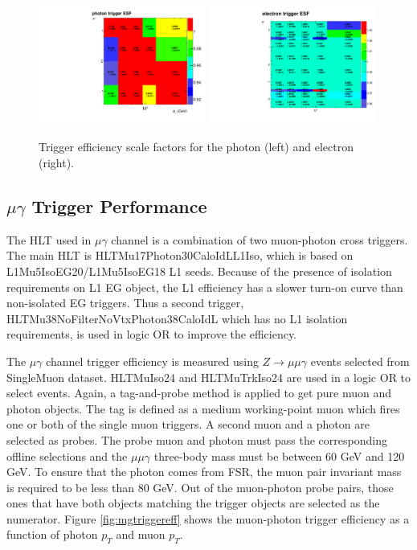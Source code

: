 \documentclass[thesis.tex]{subfiles}
\renewcommand\_{\textunderscore\allowbreak}
\begin{document}
\begin{figure}[tb]
  \centering
  \includegraphics[width=0.49\textwidth]{Figures/egTrigger_LeadingESF.pdf}
  \includegraphics[width=0.49\textwidth]{Figures/egTrigger_TrailingESF.pdf}
 \caption{Trigger efficiency scale factors for the photon (left) and electron (right). }
  \label{fig:egtriggerESF}
\end{figure}


\subsection{$\mu\gamma$ Trigger Performance}

The HLT used in $\mu\gamma$ channel is a combination of two muon-photon cross triggers.
The main HLT is HLT\_Mu17\_Photon30\_CaloIdL\_L1Iso, which is based on L1\_Mu5\_IsoEG20/L1\_Mu5\_IsoEG18 L1 seeds. 
Because of the presence of isolation requirements on L1 EG object, the L1 efficiency has a slower turn-on curve than non-isolated EG triggers.
Thus a second trigger, HLT\_Mu38NoFilterNoVtx\_Photon38\_CaloIdL which has no L1 isolation requirements, is used in logic OR to improve the efficiency.

The $\mu\gamma$ channel trigger efficiency is measured using $Z\rightarrow\mu\mu\gamma$ events selected from SingleMuon dataset. 
HLT\_MuIso24 and HLT\_MuTrkIso24 are used in a logic OR to select events. 
Again, a tag-and-probe method is applied to get pure muon and photon objects. 
The tag is defined as a medium working-point muon which fires one or both of the single muon triggers.
 A second muon and a photon are selected as probes. 
 The probe muon and photon must pass the corresponding offline selections and the $\mu\mu\gamma$ three-body mass must be between 60 GeV and 120 GeV. 
 To ensure that the photon comes from FSR, the muon pair invariant mass is required to be less than 80 GeV. 
 Out of the muon-photon probe pairs, those ones that have both objects matching the trigger objects are selected as the numerator. 
 Figure \ref{fig:mgtriggereff} shows the muon-photon trigger efficiency as a function of photon $p_{T}$ and muon $p_{T}$. 
\end{document}
